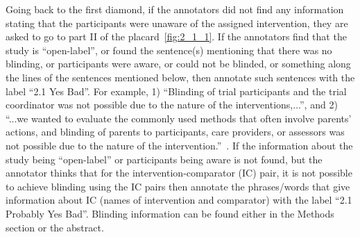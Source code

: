 \documentclass[sn-mathphys,Numbered]{sn-jnl}%
\begin{document}
Going back to the first diamond, if the annotators did not find any information stating that the participants were unaware of the assigned intervention, they are asked to go to part II of the placard~\ref{fig:2_1_1}.
If the annotators find that the study is ``open-label'', or found the sentence(s) mentioning that there was no blinding, or participants were aware, or could not be blinded, or something along the lines of the sentences mentioned below, then annotate such sentences with the label ``2.1 Yes Bad''.
For example, 1) ``Blinding of trial participants and the trial coordinator was not possible due to the nature of the interventions,...'', and 2) ``...we wanted to evaluate the commonly used methods that often involve parents’ actions, and blinding of parents to participants, care providers, or assessors was not possible due to the nature of the intervention.''~\cite{buttery2023lung,andersson2020effect}.
If the information about the study being ``open-label'' or participants being aware is not found, but the annotator thinks that for the intervention-comparator (IC) pair, it is not possible to achieve blinding using the IC pairs then annotate the phrases/words that give information about IC (names of intervention and comparator) with the label ``2.1 Probably Yes Bad''.
Blinding information can be found either in the Methods section or the abstract.
%
%
%
\end{document}
